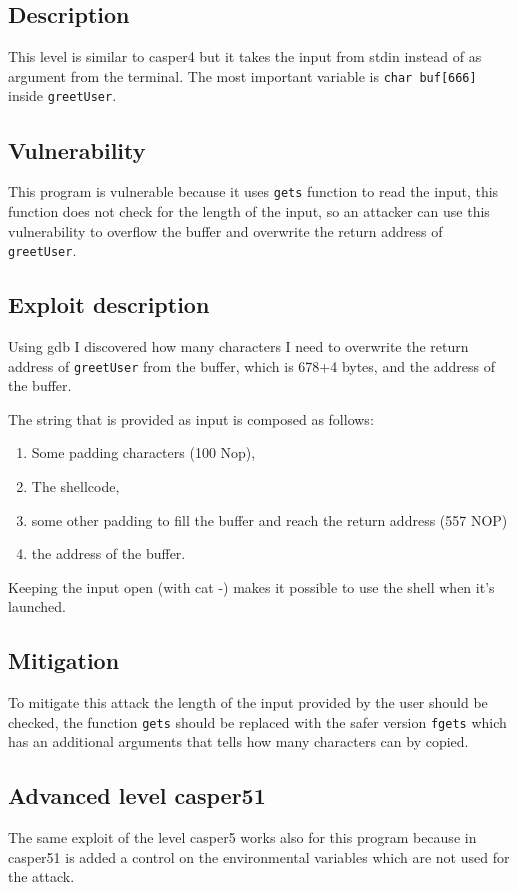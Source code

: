 \documentclass[a4paper,12pt]{article}
\begin{document}
\subsection{Description}
This level is similar to casper4 but it takes the input from stdin instead of as argument from the terminal.
The most important variable is \texttt{char buf[666]} inside \texttt{greetUser}.


\subsection{Vulnerability}
This program is vulnerable because it uses \texttt{gets} function to read the input, this function does not check for the length of the input, so an attacker can use this vulnerability to overflow the buffer and overwrite the return address of \texttt{greetUser}.


\subsection{Exploit description}
Using gdb I discovered how many characters I need to overwrite the return address of \texttt{greetUser} from the buffer, which is 678+4 bytes, and the address of the buffer.

The string that is provided as input is composed as follows:
\begin{enumerate}
\item Some padding characters (100 Nop),
\item The shellcode,
\item some other padding to fill the buffer and reach the return address (557 NOP)
\item the address of the buffer.
\end{enumerate}

Keeping the input open (with cat -) makes it possible to use the shell when it's launched.


\subsection{Mitigation}

To mitigate this attack the length of the input provided by the user should be checked, the function \texttt{gets} should be replaced with the safer version \texttt{fgets} which has an additional arguments that tells how many characters can by copied.

\subsection{Advanced level casper51}
The same exploit of the level casper5 works also for this program because in casper51 is added a control on the environmental variables which are not used for the attack. 
\end{document}
